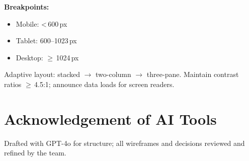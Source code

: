 \documentclass[11pt,a4paper]{article}
\begin{document}
\textbf{Breakpoints:}
\begin{itemize}[nosep]
  \item Mobile: <\,600\,px
  \item Tablet: 600--1023\,px
  \item Desktop: $\geq$\,1024\,px
\end{itemize}
Adaptive layout: stacked $\to$ two-column $\to$ three-pane. Maintain contrast ratios $\geq$\,4.5:1; announce data loads for screen readers.

\section{Acknowledgement of AI Tools}
Drafted with GPT-4o for structure; all wireframes and decisions reviewed and refined by the team.
\end{document}
